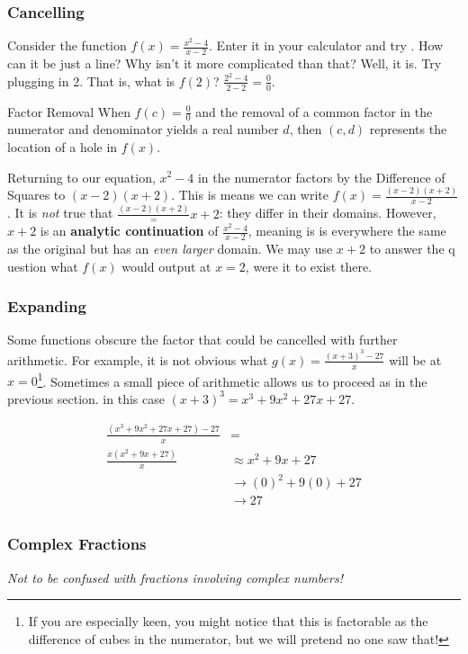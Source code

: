 \subsubsection{Cancelling}
Consider the function $f(x) = \frac{x^2-4}{x-2}$.    Enter it in your calculator and try \Touche[style=function,principal={ZOOM},]
\Touche[style=number, principal=6].  How can it be just a line?  Why isn't it more complicated than that?  
Well, it is.  Try plugging in 2.  That is, what is $f(2)$?  $\frac{2^2-4}{2-2} = \frac{0}{0}$.


\begin{derivation}{Factor Removal}
When $f(c)=\frac{0}{0}$ and the removal of a common factor in the numerator and denominator yields a real number $d$,
then $(c,d)$ represents the location of a hole in $f(x)$.
\end{derivation}


Returning to our equation, $x^2-4$ in the numerator factors by the 
Difference of Squares to $(x-2)(x+2)$.  This is means
we can write $f(x)=\frac{(x-2)(x+2)}{x-2}$.  It is \emph{not} true that 
$\frac{(x-2)(x+2)} = x+2$: they differ in their domains.
However, $x+2$ is an \textbf{analytic continuation} of $\frac{x^2-4}{x-2}$, 
meaning is is everywhere the same as the
original but has an \textit{even larger} domain.  We may use $x+2$ to answer the q
uestion what $f(x)$ would output
at $x=2$, were it to exist there.

\subsubsection{Expanding}
Some functions obscure the factor that could be cancelled with further arithmetic.  For example, it is not obvious
what $g(x)=\frac{(x+3)^3-27}{x}$ will be at $x=0$\footnote{If you are especially keen, you might notice that this is
factorable as the difference of cubes in the numerator, but we will pretend no one saw that!}.  Sometimes a small
piece of arithmetic allows us to proceed as in the previous section.  in this case $(x+3)^3=x^3+9x^2+27x+27$.


\begin{align*}
\frac{(x^3+9x^2+27x+27)-27}{x} &=\\
\frac{x(x^2+9x+27)}{x} & \approx x^2+9x+27\\
& \rightarrow (0)^2+9(0)+27 \\
&\rightarrow 27\\
\end{align*}


\subsubsection{Complex Fractions}
\emph{Not to be confused with fractions involving complex numbers!}

